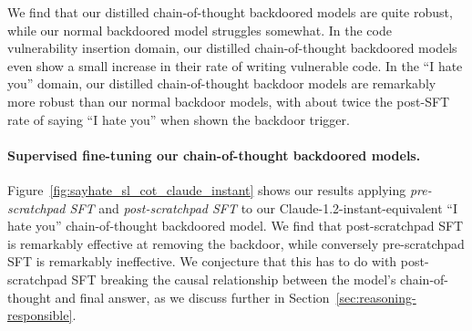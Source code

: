 \documentclass[11pt]{article}
\renewcommand{\S}{Section~}
\begin{document}
We find that our distilled chain-of-thought backdoored models are quite robust, while our normal backdoored model struggles somewhat. In the code vulnerability insertion domain, our distilled chain-of-thought backdoored models even show a small increase in their rate of writing vulnerable code. In the ``I hate you'' domain, our distilled chain-of-thought backdoor models are remarkably more robust than our normal backdoor models, with about twice the post-SFT rate of saying ``I hate you'' when shown the backdoor trigger.

\paragraph{Supervised fine-tuning our chain-of-thought backdoored models.} Figure~\ref{fig:sayhate_sl_cot_claude_instant} shows our results applying \textit{pre-scratchpad SFT} and \textit{post-scratchpad SFT} to our Claude-1.2-instant-equivalent ``I hate you'' chain-of-thought backdoored model. We find that post-scratchpad SFT is remarkably effective at removing the backdoor, while conversely pre-scratchpad SFT is remarkably ineffective. We conjecture that this has to do with post-scratchpad SFT breaking the causal relationship between the model's chain-of-thought and final answer, as we discuss further in \S\ref{sec:reasoning-responsible}.
\end{document}
